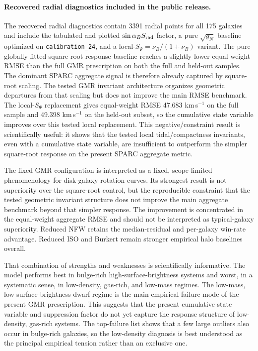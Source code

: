 ﻿\documentclass[twocolumn]{aastex701}
\begin{document}
\paragraph{Recovered radial diagnostics included in the public release.} The recovered radial diagnostics contain 3391 radial points for all 175 galaxies and include the tabulated and plotted $\sin\alpha_B S_{\rm rad}$ factor, a pure $\sqrt{g_N}$ baseline optimized on \texttt{calibration\_24}, and a local-$S_\Psi=\nu_B/(1+\nu_B)$ variant. The pure globally fitted square-root response baseline reaches a slightly lower equal-weight RMSE than the full GMR prescription on both the full and held-out samples. The dominant SPARC aggregate signal is therefore already captured by square-root scaling. The tested GMR invariant architecture organizes geometric departures from that scaling but does not improve the main RMSE benchmark. The local-$S_\Psi$ replacement gives equal-weight RMSE 47.683 km\,s$^{-1}$ on the full sample and 49.398 km\,s$^{-1}$ on the held-out subset, so the cumulative state variable improves over this tested local replacement. This negative/constraint result is scientifically useful: it shows that the tested local tidal/compactness invariants, even with a cumulative state variable, are insufficient to outperform the simpler square-root response on the present SPARC aggregate metric.


The fixed GMR configuration is interpreted as a fixed, scope-limited phenomenology for disk-galaxy rotation curves. Its strongest result is not superiority over the square-root control, but the reproducible constraint that the tested geometric invariant structure does not improve the main aggregate benchmark beyond that simpler response. The improvement is concentrated in the equal-weight aggregate RMSE and should not be interpreted as typical-galaxy superiority. Reduced NFW retains the median-residual and per-galaxy win-rate advantage. Reduced ISO and Burkert remain stronger empirical halo baselines overall.

That combination of strengths and weaknesses is scientifically informative. The model performs best in bulge-rich high-surface-brightness systems and worst, in a systematic sense, in low-density, gas-rich, and low-mass regimes. The low-mass, low-surface-brightness dwarf regime is the main empirical failure mode of the present GMR prescription. This suggests that the present cumulative state variable and suppression factor do not yet capture the response structure of low-density, gas-rich systems. The top-failure list shows that a few large outliers also occur in bulge-rich galaxies, so the low-density diagnosis is best understood as the principal empirical tension rather than an exclusive one.
\end{document}

